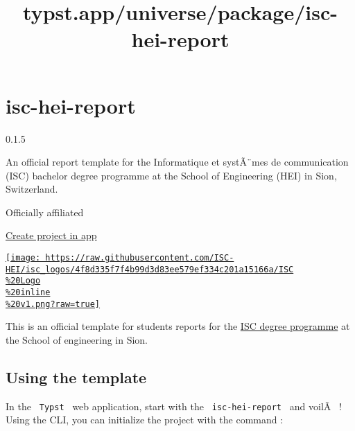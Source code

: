 \title{typst.app/universe/package/isc-hei-report}

\label{banner}
\label{template-thumbnail}

\section{isc-hei-report}\label{isc-hei-report}

{ 0.1.5 }

An official report template for the \textquotesingle Informatique et
systÃ¨mes de communication\textquotesingle{} (ISC) bachelor degree
programme at the School of Engineering (HEI) in Sion, Switzerland.

{ } Officially affiliated

\href{/app?template=isc-hei-report&version=0.1.5}{Create project in app}

\label{readme}

\href{https://hevs.ch/isc}{\texttt{[image: https://raw.githubusercontent.com/ISC-HEI/isc\_logos/4f8d335f7f4b99d3d83ee579ef334c201a15166a/ISC\\\%20Logo\\\%20inline\\\%20v1.png?raw=true]}}

This is an official template for students reports for the
\href{https://isc.hevs.ch/}{ISC degree programme} at the School of
engineering in Sion.

\subsection{Using the template}\label{using-the-template}

In the \texttt{\ Typst\ } web application, start with the
\texttt{\ isc-hei-report\ } and voilÃ~ ! Using the CLI, you can
initialize the project with the command :

\begin{Shaded}
\begin{Highlighting}[]
\end{Highlighting}
\end{Shaded}

